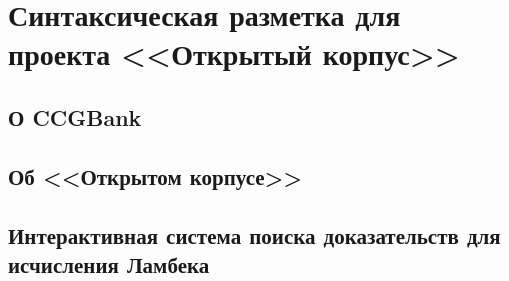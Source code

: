 \chapter{Синтаксическая разметка для проекта <<Открытый корпус>>}

\section{О CCGBank}

\section{Об <<Открытом корпусе>>}

\section{Интерактивная система поиска доказательств для исчисления Ламбека}

